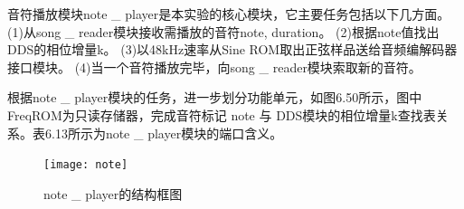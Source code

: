 \documentclass{../source/Experiment}
\begin{document}
                音符播放模块note \_ player是本实验的核心模块，它主要任务包括以下几方面。
                (1)从song \_ reader模块接收需播放的音符{note, duration}。
                (2)根据note值找出 DDS的相位增量k。
                (3)以48kHz速率从Sine ROM取出正弦样品送给音频编解码器接口模块。
                (4)当一个音符播放完毕，向song \_ reader模块索取新的音符。
                
                根据note \_ player模块的任务，进一步划分功能单元，如图6.50所示，图中FreqROM为只读存储器，完成音符标记 note 与 DDS模块的相位增量k查找表关系。表6.13所示为note \_ player模块的端口含义。

                \begin{figure}[H]
                    \centering
                    \texttt{[image: note]}
                    \caption{note \_ player的结构框图}
                \end{figure}
\end{document}
